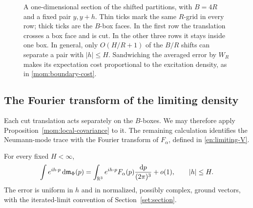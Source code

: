 \begin{figure}[tb]
 \centering
 
 \caption{A one-dimensional section of the shifted partitions, with
 $B=4R$ and a fixed pair $y,y+h$. Thin ticks mark the same $R$-grid in
 every row; thick ticks are the $B$-box faces. In the first row the
 translation crosses a box face and is cut. In the other three rows it
 stays inside one box. In general, only $O(H/R+1)$ of the $B/R$ shifts
 can separate a pair with $|h|\le H$. Sandwiching the averaged error
 by $W_R$ makes its expectation cost proportional to the excitation
 density, as in \eqref{mom:boundary-cost}.}
 \label{fig:shifted-grid}
\end{figure}

\subsection{The Fourier transform of the limiting density}

Each cut translation acts separately on the $B$-boxes. We may therefore
apply Proposition~\ref{mom:local-covariance} to it. The remaining
calculation identifies the Neumann-mode trace with the Fourier transform
of $F_\alpha$, defined in \eqref{en:limiting-V}.

\begin{proposition}
\label{mom:characteristic}
For every fixed $H<\infty$,
\begin{equation}\label{mom:characteristic-limit}
 \int e^{ih\cdot p}\,\mathrm d\mathfrak m_\Phi(p)
     =\int_{\mathbb R^3}e^{ih\cdot p}F_\alpha(p)
                          \frac{\mathrm d p}{(2\pi)^3}+o(1),
 \qquad |h|\le H.
\end{equation}
The error is uniform in $h$ and in normalized, possibly complex,
ground vectors, with the iterated-limit convention of
Section~\ref{set:section}.
\end{proposition}

